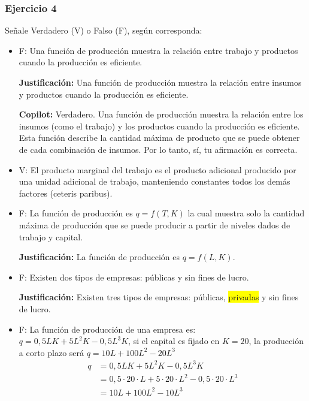 \documentclass{templateNote}
\newcommand{\destacar}[1]{ \colorbox{yellow}{#1}}
\begin{document}
\subsubsection{Ejercicio 4}
Señale Verdadero (V) o Falso (F), según corresponda:
\begin{itemize}
    \item F: Una función de producción muestra la relación entre trabajo y productos cuando la
    producción es eficiente.

    \textbf{Justificación:} Una función de producción muestra la relación entre insumos y productos cuando la producción es eficiente.

    \textbf{Copilot:} Verdadero. Una función de producción muestra la relación entre los insumos (como el trabajo) y los productos cuando la producción es eficiente. Esta función describe la cantidad máxima de producto que se puede obtener de cada combinación de insumos. Por lo tanto, sí, tu afirmación es correcta.
    
    \item V: El producto marginal del trabajo es el producto adicional producido por una unidad
    adicional de trabajo, manteniendo constantes todos los demás factores (ceteris paribus).
    
    \item F:  La función de producción es $q = f(T, K)$ la cual muestra solo la cantidad máxima de
    producción que se puede producir a partir de niveles dados de trabajo y capital.
    
    \textbf{Justificación:} La función de producción es $q = f(L, K)$.
    
    \item F: Existen dos tipos de empresas: públicas y sin fines de lucro.
    
    \textbf{Justificación:} Existen tres tipos de empresas: públicas, \destacar{privadas} y sin fines de lucro.

    \item F: La función de producción de una empresa es: $ q = 0,5 LK + 5 L^2K - 0,5 L^3K$, si el capital es fijado en $K = 20$, la producción a corto plazo será $q = 10 L + 100 L^2 - 20 L^3$
    \begin{align*}
        q &= 0,5 LK + 5 L^2K - 0,5 L^3K \\
        &= 0,5 \cdot 20 \cdot L + 5 \cdot 20 \cdot L^2 - 0,5 \cdot 20 \cdot L^3 \\
        &= 10L + 100L^2 - 10L^3
    \end{align*}
\end{itemize}
\end{document}

